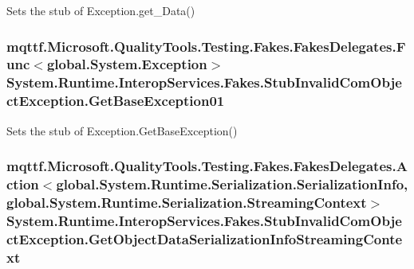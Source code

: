 Sets the stub of Exception.\-get\-\_\-\-Data()

\hypertarget{class_system_1_1_runtime_1_1_interop_services_1_1_fakes_1_1_stub_invalid_com_object_exception_a0cd8b803504b38662cb6c003bce6a24a}{
\subsubsection[{Get\-Base\-Exception01}]{\setlength{\rightskip}{0pt plus 5cm}mqttf.\-Microsoft.\-Quality\-Tools.\-Testing.\-Fakes.\-Fakes\-Delegates.\-Func$<$global.\-System.\-Exception$>$ System.\-Runtime.\-Interop\-Services.\-Fakes.\-Stub\-Invalid\-Com\-Object\-Exception.\-Get\-Base\-Exception01}}\label{class_system_1_1_runtime_1_1_interop_services_1_1_fakes_1_1_stub_invalid_com_object_exception_a0cd8b803504b38662cb6c003bce6a24a}


Sets the stub of Exception.\-Get\-Base\-Exception()

\hypertarget{class_system_1_1_runtime_1_1_interop_services_1_1_fakes_1_1_stub_invalid_com_object_exception_a56aac0a3b91f3dace762590fa45ef546}{
\subsubsection[{Get\-Object\-Data\-Serialization\-Info\-Streaming\-Context}]{\setlength{\rightskip}{0pt plus 5cm}mqttf.\-Microsoft.\-Quality\-Tools.\-Testing.\-Fakes.\-Fakes\-Delegates.\-Action$<$global.\-System.\-Runtime.\-Serialization.\-Serialization\-Info, global.\-System.\-Runtime.\-Serialization.\-Streaming\-Context$>$ System.\-Runtime.\-Interop\-Services.\-Fakes.\-Stub\-Invalid\-Com\-Object\-Exception.\-Get\-Object\-Data\-Serialization\-Info\-Streaming\-Context}}\label{class_system_1_1_runtime_1_1_interop_services_1_1_fakes_1_1_stub_invalid_com_object_exception_a56aac0a3b91f3dace762590fa45ef546}


